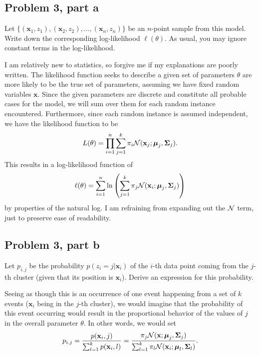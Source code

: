 \subsection{Problem 3, part a}
Let $\{(\textbf{x}_1, z_1), (\textbf{x}_2, z_2), ..., (\textbf{x}_n, z_n)\}$ be an $n$-point sample from this model. Write down the corresponding log-likelihood $\ell(\theta)$. As usual, you may ignore constant terms in the log-likelihood. 
\partbreak
\begin{solution}

    I am relatively new to statistics, so forgive me if my explanations are poorly written. The likelihood function seeks to describe a given set of parameters $\theta$ are more likely to be the true set of parameters, assuming we have fixed random variables $\textbf{x}$. Since the given parameters are discrete and constitute all probable cases for the model, we will sum over them for each random instance encountered. Furthermore, since each random instance is assumed independent, we have the likelihood function to be 
    \[L(\theta) = \prod_{i = 1}^n \sum_{j = 1}^k \pi_i \mathcal{N} (\textbf{x}_j; \boldsymbol{\mu}_j, \boldsymbol{\Sigma}_j).\]
    This results in a log-likelihood function of 
    \[\ell(\theta) = \sum_{i =1}^n \ln\left(\sum_{j = 1}^k \pi_j \mathcal{N} (\textbf{x}_i; \boldsymbol{\mu}_j, \boldsymbol{\Sigma}_j)\right)\]
    by properties of the natural log. I am refraining from expanding out the $\mathcal{N}$ term, just to preserve ease of readability.
\end{solution}


\newpage
\subsection{Problem 3, part b}
Let $p_{i, j}$ be the probability $p(z_i = j | \textbf{x}_i)$ of the $i$-th data point coming from the $j$-th cluster (given that its position is $\textbf{x}_i$). Derive an expression for this probability.  
\partbreak
\begin{solution}

    Seeing as though this is an occurrence of one event happening from a set of $k$ events ($\textbf{x}_i$ being in the $j$-th cluster), we would imagine that the probability of this event occurring would result in the proportional behavior of the values of $j$ in the overall parameter $\theta$. In other words, we would set 
    \[p_{i, j} = \frac{p(\textbf{x}_i, j)}{\sum_{l = 1}^k p(\textbf{x}_i, l)} = \frac{\pi_j\mathcal{N}(\textbf{x}; \boldsymbol{\mu}_j, \boldsymbol{\Sigma}_j)}{\sum_{l = 1}^k \pi_l \mathcal{N} (\textbf{x}_i ; \boldsymbol{\mu}_l, \boldsymbol{\Sigma}_l)}.\]
\end{solution}

